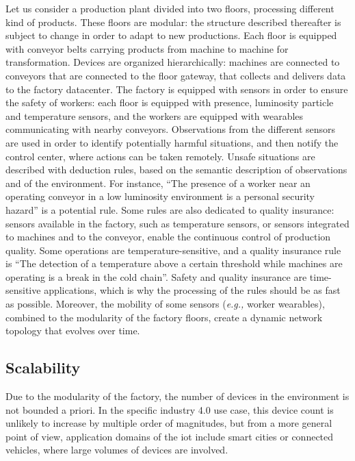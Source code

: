 \documentclass{iosart2c}
\begin{document}
Let us consider a production plant divided into two floors, processing different kind of products. 
These floors are modular: the structure described thereafter is subject to change in order to adapt to new productions.
Each floor is equipped with conveyor belts carrying products from machine to machine for transformation. 
Devices are organized hierarchically: machines are connected to conveyors that are connected to the floor gateway, that collects and delivers data to the factory datacenter. 
The factory is equipped with sensors in order to ensure the safety of workers: each floor is equipped with presence, luminosity particle and temperature sensors, and the workers are equipped with wearables communicating with nearby conveyors.
Observations from the different sensors are used in order to identify potentially harmful situations, and then notify the control center, where actions can be taken remotely.
Unsafe situations are described with deduction rules, based on the semantic description of observations and of the environment.
For instance, %
``The presence of a worker near an operating conveyor in a low luminosity environment is a personal security hazard'' is a potential rule.
Some rules are also dedicated to quality insurance: sensors available in the factory, such as temperature sensors, or sensors integrated to machines and to the conveyor, enable the continuous control of production quality.
Some operations are temperature-sensitive, and a quality insurance rule is ``The detection of a temperature above a certain threshold while machines are operating is a break in the cold chain''.
Safety and quality insurance are time-sensitive applications, which is why the processing of the rules should be as fast as possible.
Moreover, the mobility of some sensors (\textit{e.g.,} worker wearables), combined to the modularity of the factory floors, create a dynamic network topology that evolves over time.

\subsection{Scalability}

Due to the modularity of the factory, the number of devices in the environment is not bounded a priori. 
In the specific industry 4.0 use case, this device count is unlikely to increase by multiple order of magnitudes, but from a more general point of view, application domains of the \gls{iot} include smart cities or connected vehicles, where large volumes of devices are involved.
\end{document}
